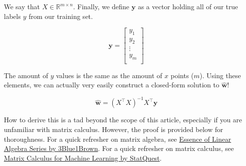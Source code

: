 \begin{flushleft}
    We say that $X \in \mathbb{R}^{m \times n}$. Finally, we define $\textbf{y}$ as a vector holding all of our true labels $y$ from our training set.

    $$\textbf{y} = \begin{bmatrix}
            y_1\\
            y_2\\
            \vdots\\
            y_m\\
            \end{bmatrix}$$

    The amount of $y$ values is the same as the amount of $x$ points ($m$). Using these elements, we can actually very easily construct a closed-form solution to $\hat{\textbf{w}}$!

    $$\hat{\textbf{w}} = (X^{\top}X)^{-1}X^{\top}\textbf{y}$$

    How to derive this is a tad beyond the scope of this article, especially if you are unfamiliar with matrix calculus. However, the proof is provided below for thoroughness. For a quick refresher on matrix algebra, see \href{https://www.youtube.com/playlist?list=PLZHQObOWTQDNU6R1_67000Dx_ZCJB-3pi}{Essence of Linear Algebra Series by 3Blue1Brown}. For a quick refresher on matrix calculus, see \href{https://www.youtube.com/watch?v=tIkzL4jlt8g}{Matrix Calculus for Machine Learning by StatQuest}.
 

\end{flushleft}

